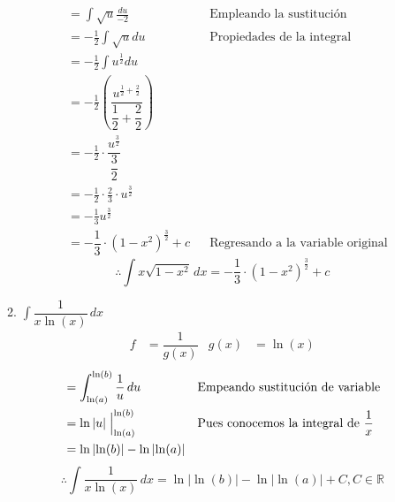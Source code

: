 \documentclass[letterpaper]{article}
\providecommand{\abs}[1]{\left|#1\right|}
\newcommand{\R}{\mathds{R}}
\renewcommand{\*}{\cdot}
\theoremstyle{definition}
\begin{document}
\begin{enumerate}
\begin{enumerate}
\begin{align*}
\end{align*}
\begin{align*}
	&= \int \sqrt{u} \frac{du}{-2} &&\text{Empleando la sustitución}\\
	&= -\frac{1}{2} \int \sqrt{u} du &&\text{Propiedades de la integral}\\
	&= -\frac{1}{2}\int u^{\frac{1}{2}} du\\
	&= -\frac{1}{2}(\dfrac{u^{\frac{1}{2}+\frac{2}{2}}}{\dfrac{1}{2}+\dfrac{2}{2}})\\
	&= -\frac{1}{2}\cdot \dfrac{u^{\frac{3}{2}}}{\dfrac{3}{2}}\\
	&= -\frac{1}{2}\cdot \frac{2}{3} \cdot u^{\frac{3}{2}}\\
	&= -\frac{1}{3} u^{\frac{3}{2}}\\
	&= -\dfrac{1}{3} \cdot (1-x^{2})^{\frac{3}{2}}+c &&\text{Regresando a la variable original}
\end{align*}
\[\therefore \int x\sqrt{1- x^2} \, dx = -\dfrac{1}{3} \cdot (1-x^{2})^{\frac{3}{2}}+c \]
\item$\displaystyle \int \dfrac{1}{x \ln(x)} \, dx$
\begin{align*}
	f&= \dfrac{1}{g(x)} & g(x) &= \ln(x)
\end{align*}
\begin{align*}
	&= \int_{\ln(a)}^{\ln(b)} \dfrac{1}{u}\,du &&\text{Empeando sustitución de variable}\\
	&= \ln\abs{u}\Bigm|_{\ln(a)}^{\ln(b)} &&\text{Pues conocemos la integral de }\dfrac{1}{x}\\
	&= \ln\abs{\ln(b)} - \ln\abs{\ln(a)}
\end{align*}
\[ \therefore \int \dfrac{1}{x \ln(x)} \, dx = \ln\abs{\ln(b)} - \ln\abs{\ln(a)} + C, C \in \R \]
\end{enumerate}


\end{enumerate}
\end{document}
